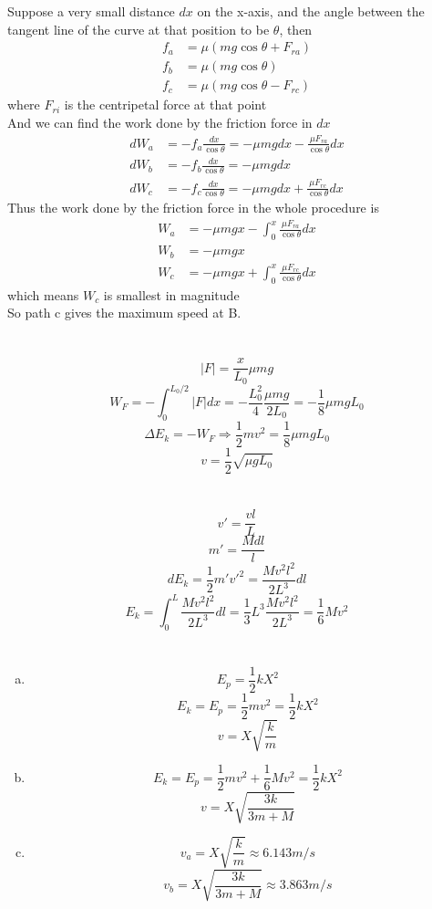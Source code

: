 \documentclass{article}
\begin{document}
\section{}
	Suppose a very small distance $dx$ on the x-axis, and the angle between the tangent line of the curve at that position to be $\theta$, then
	\begin{align*}
	f_a&=\mu(mg\cos\theta+F_{ra})\\
	f_b&=\mu(mg\cos\theta)\\
	f_c&=\mu(mg\cos\theta-F_{rc})
	\end{align*}
	where $F_{ri}$ is the centripetal force at that point\\
	And we can find the work done by the friction force in $dx$
	\begin{align*}
	dW_a&=-f_a\frac{dx}{\cos\theta}=-\mu mgdx-\frac{\mu F_{ra}}{\cos\theta}dx\\
	dW_b&=-f_b\frac{dx}{\cos\theta}=-\mu mgdx\\
	dW_c&=-f_c\frac{dx}{\cos\theta}=-\mu mgdx+\frac{\mu F_{rc}}{\cos\theta}dx
	\end{align*}
	Thus the work done by the friction force in the whole procedure is
	\begin{align*}
	W_a&=-\mu mgx-\int_0^x\frac{\mu F_{ra}}{\cos\theta}dx\\
	W_b&=-\mu mgx\\
	W_c&=-\mu mgx+\int_0^x\frac{\mu F_{rc}}{\cos\theta}dx
	\end{align*}
	which means $W_c$ is smallest in magnitude\\
	So path c gives the maximum speed at B.
\section{}
	$$|F|=\frac{x}{L_0}\mu mg$$
	$$W_F=-\int_0^{L_0/2}|F|dx=-\frac{L_0^2}{4}\frac{\mu mg}{2L_0}=-\frac{1}{8}\mu mgL_0$$
	$$\Delta E_k=-W_F\Longrightarrow\frac{1}{2}mv^2=\frac{1}{8}\mu mgL_0$$
	$$v=\frac{1}{2}\sqrt{\mu gL_0}$$
	
\section{}
	$$v'=\frac{vl}{L}$$
	$$m'=\frac{Mdl}{l}$$
	$$dE_k=\frac{1}{2}m'v'^2=\frac{Mv^2l^2}{2L^3}dl$$
	$$E_k=\int_0^L\frac{Mv^2l^2}{2L^3}dl=\frac{1}{3}L^3\frac{Mv^2l^2}{2L^3}=\frac{1}{6}Mv^2$$
	
\section{}
\begin{enumerate}[(a)]
	\item
	$$E_p=\frac{1}{2}kX^2$$
	$$E_k=E_p=\frac{1}{2}mv^2=\frac{1}{2}kX^2$$
	$$v=X\sqrt{\frac{k}{m}}$$
	\item
	$$E_k=E_p=\frac{1}{2}mv^2+\frac{1}{6}Mv^2=\frac{1}{2}kX^2$$
	$$v=X\sqrt{\frac{3k}{3m+M}}$$
	\item
	$$v_a=X\sqrt{\frac{k}{m}}\approx6.143m/s$$
	$$v_b=X\sqrt{\frac{3k}{3m+M}}\approx3.863m/s$$
\end{enumerate}	
\end{document}
